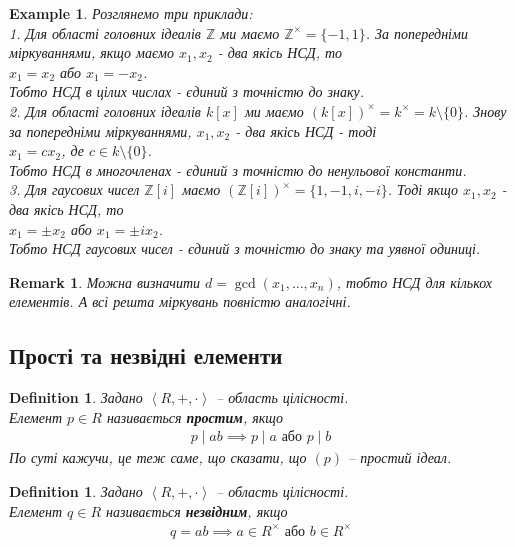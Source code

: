 \documentclass[a4paper, 10pt]{article}
\theoremstyle{theoremdd}
\theoremstyle{theoremdd}
\newtheorem{definition}[theorem]{Definition}
\theoremstyle{theoremdd}
\theoremstyle{theoremdd}
\theoremstyle{theoremdd}
\newtheorem{example}[theorem]{Example}
\theoremstyle{theoremdd}
\theoremstyle{theoremdd}
\theoremstyle{theoremdd}
\theoremstyle{theoremdd}
\theoremstyle{theoremdd}
\theoremstyle{theoremdd}
\newtheorem{remark}[theorem]{Remark}
\theoremstyle{theoremdd}
\theoremstyle{theoremdd}
\theoremstyle{theoremdd}
\theoremstyle{theoremdd}
\begin{document}
\begin{example} Розглянемо три приклади:\\
1. Для області головних ідеалів $\mathbb{Z}$ ми маємо $\mathbb{Z}^\times = \{-1,1\}$. За попередніми міркуваннями, якщо маємо $x_1,x_2$ - два якісь НСД, то\\
$x_1 = x_2$ або $x_1 = -x_2$.\\
Тобто НСД в цілих числах - єдиний з точністю до знаку.
\bigskip \\
2. Для області головних ідеалів $k[x]$ ми маємо $(k[x])^\times = k^\times = k \setminus \{0\}$. Знову за попередніми міркуваннями, $x_1,x_2$ - два якісь НСД - тоді\\
$x_1 = c x_2$, де $c \in k \setminus \{0\}$.\\
Тобто НСД в многочленах - єдиний з точністю до ненульової константи.
\bigskip \\
3. Для гаусових чисел $\mathbb{Z}[i]$ маємо $(\mathbb{Z}[i])^\times = \{1,-1,i,-i\}$. Тоді якщо $x_1,x_2$ - два якісь НСД, то\\
$x_1 = \pm x_2$ або $x_1 = \pm ix_2$.\\
Тобто НСД гаусових чисел - єдиний з точністю до знаку та уявної одиниці.
\end{example}

\begin{remark}
Можна визначити $d = \gcd(x_1,\dots,x_n)$, тобто НСД для кількох елементів. А всі решта міркувань повністю аналогічні.
\end{remark}

\subsection{Прості та незвідні елементи}
\begin{definition}
Задано $\left< R,+,\cdot \right>$ -- область цілісності.\\
Елемент $p \in R$ називається \textbf{простим}, якщо
\begin{align*}
p \mid ab \implies p \mid a \text{ або } p \mid b
\end{align*}
По суті кажучи, це теж саме, що сказати, що $(p)$ -- простий ідеал.
\end{definition}

\begin{definition}
Задано $\left< R,+,\cdot \right>$ -- область цілісності.\\
Елемент $q \in R$ називається \textbf{незвідним}, якщо
\begin{align*}
q = ab \implies a \in R^\times \text{ або } b \in R^\times
\end{align*}
\end{definition}
\end{document}
